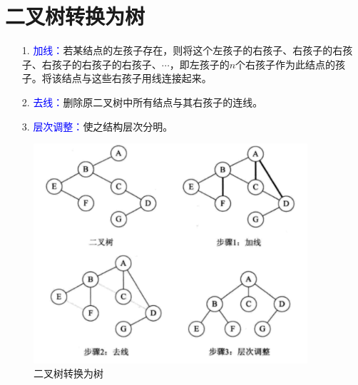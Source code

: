 \documentclass[10pt]{article}
\newcommand{\blue}{\textcolor{blue}}
\begin{document}
\section{二叉树转换为树}
\begin{itemize}
\item[1.]  \blue{加线：}若某结点的左孩子存在，则将这个左孩子的右孩子、右孩子的右孩子、右孩子的右孩子的右孩子、$\cdots$，即左孩子的$n$个右孩子作为此结点的孩子。将该结点与这些右孩子用线连接起来。 
\item[2.]  \blue{去线：}删除原二叉树中所有结点与其右孩子的连线。
\item[3.]  \blue{层次调整：}使之结构层次分明。
\end{itemize}
\begin{figure}[htbp]
\centering
\includegraphics[width=4in]{fig/bitree2tree.pdf}
\caption{二叉树转换为树}
\end{figure}
\end{document}
